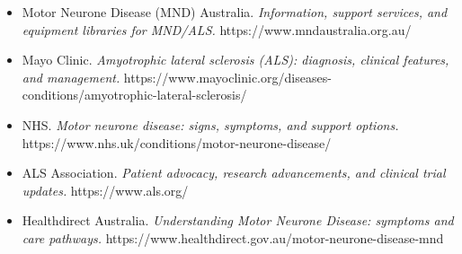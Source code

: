 \begin{itemize}
    \item Motor Neurone Disease (MND) Australia. \textit{Information, support services, and equipment libraries for MND/ALS.} https://www.mndaustralia.org.au/
    \item Mayo Clinic. \textit{Amyotrophic lateral sclerosis (ALS): diagnosis, clinical features, and management.} https://www.mayoclinic.org/diseases-conditions/amyotrophic-lateral-sclerosis/
    \item NHS. \textit{Motor neurone disease: signs, symptoms, and support options.} https://www.nhs.uk/conditions/motor-neurone-disease/
    \item ALS Association. \textit{Patient advocacy, research advancements, and clinical trial updates.} https://www.als.org/
    \item Healthdirect Australia. \textit{Understanding Motor Neurone Disease: symptoms and care pathways.} https://www.healthdirect.gov.au/motor-neurone-disease-mnd
\end{itemize}
